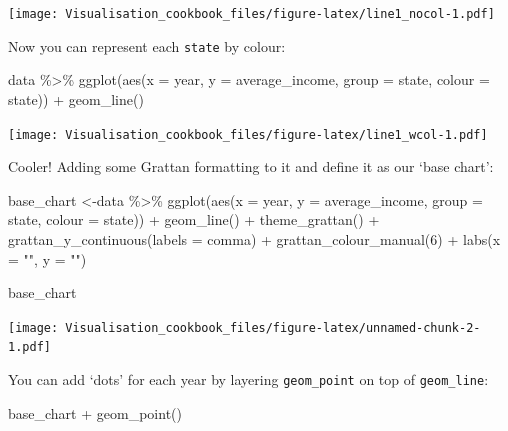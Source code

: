 \documentclass[
]{book}
\newenvironment{Shaded}{\begin{snugshade}}{\end{snugshade}}
\newcommand{\AttributeTok}[1]{\textcolor[rgb]{0.77,0.63,0.00}{#1}}
\newcommand{\DecValTok}[1]{\textcolor[rgb]{0.00,0.00,0.81}{#1}}
\newcommand{\FunctionTok}[1]{\textcolor[rgb]{0.00,0.00,0.00}{#1}}
\newcommand{\NormalTok}[1]{#1}
\newcommand{\OtherTok}[1]{\textcolor[rgb]{0.56,0.35,0.01}{#1}}
\newcommand{\SpecialCharTok}[1]{\textcolor[rgb]{0.00,0.00,0.00}{#1}}
\newcommand{\StringTok}[1]{\textcolor[rgb]{0.31,0.60,0.02}{#1}}
\begin{document}
\texttt{[image: Visualisation\_cookbook\_files/figure-latex/line1\_nocol-1.pdf]}

Now you can represent each \texttt{state} by colour:

\begin{Shaded}
\begin{Highlighting}[]
\NormalTok{data }\SpecialCharTok{\%\textgreater{}\%} 
  \FunctionTok{ggplot}\NormalTok{(}\FunctionTok{aes}\NormalTok{(}\AttributeTok{x =}\NormalTok{ year,}
             \AttributeTok{y =}\NormalTok{ average\_income,}
             \AttributeTok{group =}\NormalTok{ state,}
             \AttributeTok{colour =}\NormalTok{ state)) }\SpecialCharTok{+} 
  \FunctionTok{geom\_line}\NormalTok{()}
\end{Highlighting}
\end{Shaded}

\texttt{[image: Visualisation\_cookbook\_files/figure-latex/line1\_wcol-1.pdf]}

Cooler! Adding some Grattan formatting to it and define it as our `base chart':

\begin{Shaded}
\begin{Highlighting}[]
\NormalTok{base\_chart }\OtherTok{\textless{}{-}}\NormalTok{data }\SpecialCharTok{\%\textgreater{}\%} 
  \FunctionTok{ggplot}\NormalTok{(}\FunctionTok{aes}\NormalTok{(}\AttributeTok{x =}\NormalTok{ year,}
             \AttributeTok{y =}\NormalTok{ average\_income,}
             \AttributeTok{group =}\NormalTok{ state,}
             \AttributeTok{colour =}\NormalTok{ state)) }\SpecialCharTok{+} 
  \FunctionTok{geom\_line}\NormalTok{() }\SpecialCharTok{+}
  \FunctionTok{theme\_grattan}\NormalTok{() }\SpecialCharTok{+} 
  \FunctionTok{grattan\_y\_continuous}\NormalTok{(}\AttributeTok{labels =}\NormalTok{ comma) }\SpecialCharTok{+} 
  \FunctionTok{grattan\_colour\_manual}\NormalTok{(}\DecValTok{6}\NormalTok{) }\SpecialCharTok{+}
  \FunctionTok{labs}\NormalTok{(}\AttributeTok{x =} \StringTok{""}\NormalTok{,}
       \AttributeTok{y =} \StringTok{""}\NormalTok{)}

\NormalTok{base\_chart}
\end{Highlighting}
\end{Shaded}

\texttt{[image: Visualisation\_cookbook\_files/figure-latex/unnamed-chunk-2-1.pdf]}

You can add `dots' for each year by layering \texttt{geom\_point} on top of \texttt{geom\_line}:

\begin{Shaded}
\begin{Highlighting}[]
\NormalTok{base\_chart }\SpecialCharTok{+}
  \FunctionTok{geom\_point}\NormalTok{()}
\end{Highlighting}
\end{Shaded}
\end{document}
